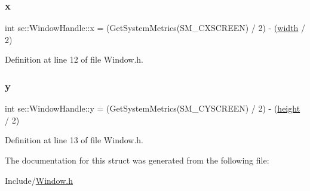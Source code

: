 \mbox{\label{structse_1_1_window_handle_a10cdc1524da4df60951578858b66901d}} 
\subsubsection{\texorpdfstring{x}{x}}
{\footnotesize\ttfamily int se\+::\+Window\+Handle\+::x = (Get\+System\+Metrics(S\+M\+\_\+\+C\+X\+S\+C\+R\+E\+EN) / 2) -\/ (\mbox{\hyperlink{structse_1_1_window_handle_a66814701369b6e581dcaa3d3ac468f5e}{width}} / 2)}



Definition at line 12 of file Window.\+h.

\mbox{\label{structse_1_1_window_handle_a49c3cce4b0181f39e5b8443acee2083a}} 
\subsubsection{\texorpdfstring{y}{y}}
{\footnotesize\ttfamily int se\+::\+Window\+Handle\+::y = (Get\+System\+Metrics(S\+M\+\_\+\+C\+Y\+S\+C\+R\+E\+EN) / 2) -\/ (\mbox{\hyperlink{structse_1_1_window_handle_a15729c4003be289e00604856310d988b}{height}} / 2)}



Definition at line 13 of file Window.\+h.



The documentation for this struct was generated from the following file\+:\begin{DoxyCompactItemize}
\item 
Include/\mbox{\hyperlink{_window_8h}{Window.\+h}}\end{DoxyCompactItemize}
